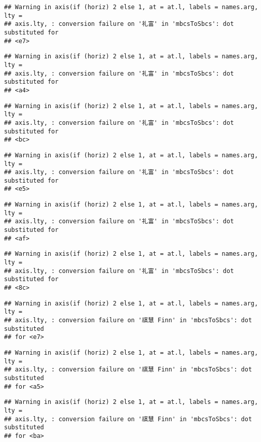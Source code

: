 \documentclass[
]{article}
\begin{document}
\begin{verbatim}
## Warning in axis(if (horiz) 2 else 1, at = at.l, labels = names.arg, lty =
## axis.lty, : conversion failure on '礼富' in 'mbcsToSbcs': dot substituted for
## <e7>
\end{verbatim}

\begin{verbatim}
## Warning in axis(if (horiz) 2 else 1, at = at.l, labels = names.arg, lty =
## axis.lty, : conversion failure on '礼富' in 'mbcsToSbcs': dot substituted for
## <a4>
\end{verbatim}

\begin{verbatim}
## Warning in axis(if (horiz) 2 else 1, at = at.l, labels = names.arg, lty =
## axis.lty, : conversion failure on '礼富' in 'mbcsToSbcs': dot substituted for
## <bc>
\end{verbatim}

\begin{verbatim}
## Warning in axis(if (horiz) 2 else 1, at = at.l, labels = names.arg, lty =
## axis.lty, : conversion failure on '礼富' in 'mbcsToSbcs': dot substituted for
## <e5>
\end{verbatim}

\begin{verbatim}
## Warning in axis(if (horiz) 2 else 1, at = at.l, labels = names.arg, lty =
## axis.lty, : conversion failure on '礼富' in 'mbcsToSbcs': dot substituted for
## <af>
\end{verbatim}

\begin{verbatim}
## Warning in axis(if (horiz) 2 else 1, at = at.l, labels = names.arg, lty =
## axis.lty, : conversion failure on '礼富' in 'mbcsToSbcs': dot substituted for
## <8c>
\end{verbatim}

\begin{verbatim}
## Warning in axis(if (horiz) 2 else 1, at = at.l, labels = names.arg, lty =
## axis.lty, : conversion failure on '祺慧 Finn' in 'mbcsToSbcs': dot substituted
## for <e7>
\end{verbatim}

\begin{verbatim}
## Warning in axis(if (horiz) 2 else 1, at = at.l, labels = names.arg, lty =
## axis.lty, : conversion failure on '祺慧 Finn' in 'mbcsToSbcs': dot substituted
## for <a5>
\end{verbatim}

\begin{verbatim}
## Warning in axis(if (horiz) 2 else 1, at = at.l, labels = names.arg, lty =
## axis.lty, : conversion failure on '祺慧 Finn' in 'mbcsToSbcs': dot substituted
## for <ba>
\end{verbatim}
\end{document}
